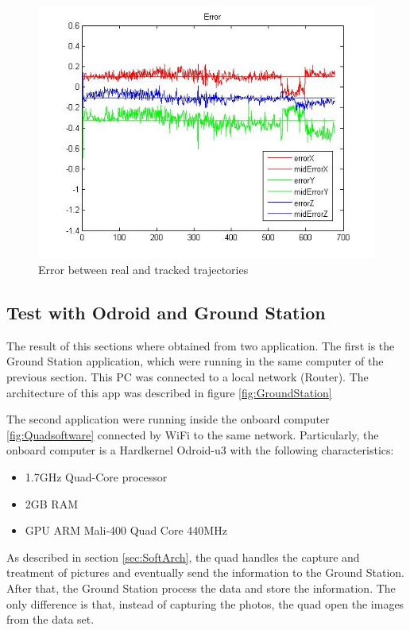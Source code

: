 	\begin{figure}[htp]
		\centering
		\includegraphics[width=0.7\linewidth]{../Images/c4/errors_stereo}
		\caption{Error between real and tracked trajectories}
		\label{fig:errors_stereo_PC}
	\end{figure}	
	
	\newpage
	
\subsection{Test with Odroid and Ground Station}
	\label{test_with_odroid_and_GT}
	
	The result of this sections where obtained from two application. The first is the Ground Station application, which were running in the same computer of the previous section. This PC was connected to a local network (Router). The architecture of this app  was described in figure \ref{fig:GroundStation}
	
	The second application were running inside the onboard computer \ref{fig:Quadsoftware} connected by WiFi to the same network. Particularly, the onboard computer is a Hardkernel Odroid-u3 with the following characteristics:
	
	\begin{itemize}
		\item 1.7GHz Quad-Core processor 
		\item 2GB RAM
		\item GPU ARM Mali-400 Quad Core 440MHz  
	\end{itemize}
	
	As described in section \ref{sec:SoftArch}, the quad handles the capture and treatment of pictures and eventually send the information to the Ground Station. After that, the Ground Station process the data and store the information. The only difference is that, instead of capturing the photos, the quad open the images from the data set.
	
